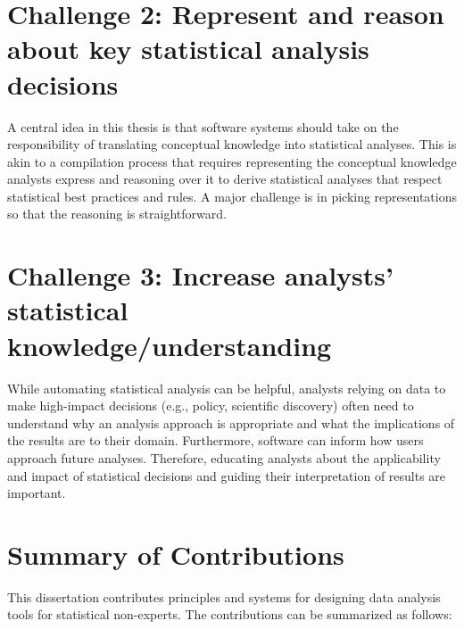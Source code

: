 


\section*{Challenge 2: Represent and reason about key statistical analysis decisions} %
A central idea in this thesis is that software systems should take on the
responsibility of translating conceptual knowledge into statistical analyses.
This is akin to a compilation process that requires representing the conceptual
knowledge analysts express and reasoning over it to derive statistical
analyses that respect statistical best practices and rules. A
major challenge is in picking representations so that the reasoning is straightforward. 

\section*{Challenge 3: Increase analysts' statistical knowledge/understanding} %
While automating statistical analysis can be helpful, analysts relying on data
to make high-impact decisions (e.g., policy, scientific discovery) often need to
understand why an analysis approach is appropriate and what the implications of
the results are to their domain. Furthermore, software can inform how users
approach future analyses. Therefore, educating analysts about the applicability
and impact of statistical decisions and guiding their interpretation of results
are important.

\section{Summary of Contributions}
This dissertation contributes principles and systems for designing data analysis
tools for statistical non-experts. The contributions can be summarized as follows: 

